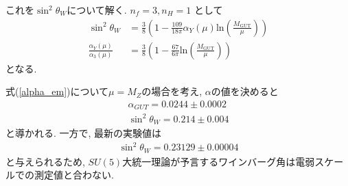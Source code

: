 これを$\sin^2\theta_W$について解く.
$n_f =3, n_H = 1$ として
\begin{align}
  \sin^2{\theta_W} &= \frac{3}{8}\left( 1 - \frac{109}{18\pi}\alpha_{Y}(\mu)\mathrm{ln}\left(\frac{M_{\mathrm{GUT}}}{\mu}\right) \right)\nonumber\\
  \frac{\alpha_{Y}{(\mu)}}{\alpha_{3}{(\mu)}} &= \frac{3}{8}\left( 1 - \frac{67}{6\pi} \mathrm{ln}\left(\frac{M_{\mathrm{GUT}}}{\mu}\right)\right)\label{alpha_em}
\end{align}
となる.

式(\ref{alpha_em})について$\mu=M_Z$の場合を考え, $\alpha$の値を決めると
\begin{align}
  \alpha_{GUT} = 0.0244\pm 0.0002\nonumber\\
  \sin^2 \theta_W = 0.214\pm 0.004\nonumber
\end{align}
と導かれる. \cite{burasAspectsGrandUnification1978}
一方で, 最新の実験値は
\begin{align}
  \sin^2\theta_W = 0.23129\pm0.00004
\end{align}
と与えられるため, $SU(5)$大統一理論が予言するワインバーグ角は電弱スケールでの測定値と合わない.

